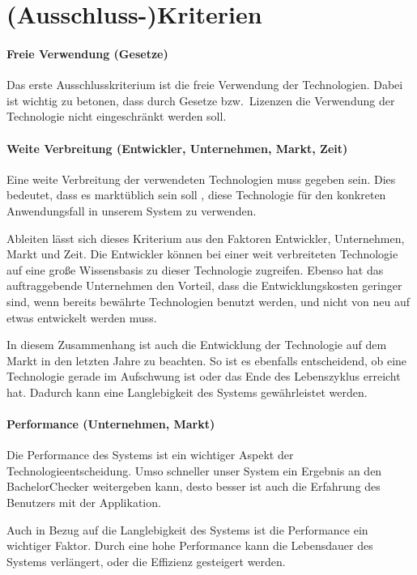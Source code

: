 \section{(Ausschluss-)Kriterien}\label{sec:ausschlusskriterien}

\paragraph{Freie Verwendung (Gesetze)}\label{par:freie-verwendung}
Das erste Ausschlusskriterium ist die freie Verwendung der Technologien.
Dabei ist wichtig zu betonen, dass durch Gesetze bzw.\ Lizenzen die
Verwendung der Technologie nicht eingeschränkt werden soll.

\paragraph{Weite Verbreitung (Entwickler, Unternehmen, Markt, Zeit)}\label{par:weite-verbreitung}
Eine weite Verbreitung der verwendeten Technologien muss gegeben sein.
Dies bedeutet, dass es marktüblich sein soll , diese Technologie für den
konkreten Anwendungsfall in unserem System zu verwenden.

Ableiten lässt sich dieses Kriterium aus den Faktoren Entwickler, Unternehmen, Markt und Zeit.
Die Entwickler können bei einer weit verbreiteten Technologie
auf eine große Wissensbasis zu dieser Technologie zugreifen.
Ebenso hat das auftraggebende Unternehmen den Vorteil, dass die Entwicklungskosten geringer sind,
wenn bereits bewährte Technologien benutzt werden, und nicht von neu auf etwas entwickelt werden muss.

In diesem Zusammenhang ist auch die Entwicklung der Technologie auf dem
Markt in den letzten Jahre zu beachten.
So ist es ebenfalls entscheidend, ob eine Technologie gerade im Aufschwung
ist oder das Ende des Lebenszyklus erreicht hat.
Dadurch kann eine Langlebigkeit des Systems gewährleistet werden.

\paragraph{Performance (Unternehmen, Markt)}\label{par:performance}
Die Performance des Systems ist ein wichtiger Aspekt der Technologieentscheidung.
Umso schneller unser System ein Ergebnis an den BachelorChecker weitergeben kann,
desto besser ist auch die Erfahrung des Benutzers mit der Applikation.

Auch in Bezug auf die Langlebigkeit des Systems ist die Performance ein wichtiger Faktor.
Durch eine hohe Performance kann die Lebensdauer des Systems verlängert, oder die Effizienz gesteigert werden.

